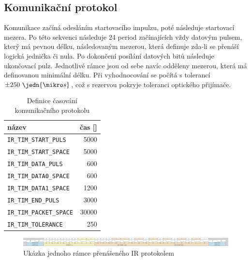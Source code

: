 \subsection{Komunikační protokol}
Komunikace začíná odesláním startovacího impulzu, poté následuje startovací mezera. Po této sekvenci následuje 24 period začínajících vždy datovým pulsem, který má pevnou délku, následovaným mezerou, která definuje zda-li se přenáší logická jednička či nula. Po dokončení posílání datových bitů následuje ukončovací pulz. Jednotlivé rámce jsou od sebe navíc odděleny mezerou, která má definovanou minimální délku. Při vyhodnocování se počítá s tolerancí $\pm250~\jedn{\mikro s}$, což s rezervou pokryje toleranci optického přijímače.

\begin{table}[H]
  \caption{Definice časování komunikačního protokolu}
  \begin{center}
  	\small
	  \begin{tabular}{|l|r|}
	    \hline
	    \textbf{název} & \textbf{čas [\jedn{\mikro s}]} \\\hline\hline
	    \texttt{IR\_TIM\_START\_PULS}       &  5000     \\\hline
	    \texttt{IR\_TIM\_START\_SPACE}      &  5000     \\\hline
	    \texttt{IR\_TIM\_DATA\_PULS}        &   600     \\\hline
	    \texttt{IR\_TIM\_DATA0\_SPACE}      &   600     \\\hline
        \texttt{IR\_TIM\_DATA1\_SPACE}      &  1200     \\\hline
        \texttt{IR\_TIM\_END\_PULS}         &  3000     \\\hline
        \texttt{IR\_TIM\_PACKET\_SPACE}     & 30000     \\\hline
        \texttt{IR\_TIM\_TOLERANCE}         &   250     \\\hline
	  \end{tabular}
  \end{center}
\end{table}

\begin{figure}[H]
    \begin{center}
        \includegraphics[width=\textwidth]{img/ir-protocol}
    \end{center}
    \caption{Ukázka jednoho rámce přenášeného IR protokolem}
\end{figure}

